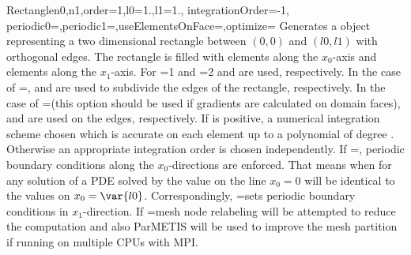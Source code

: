 \begin{funcdesc}{Rectangle}{n0,n1,order=1,l0=1.,l1=1., integrationOrder=-1, \\
  periodic0=\False,periodic1=\False,useElementsOnFace=\False,optimize=\False}
Generates a \Domain object representing a two dimensional rectangle between
$(0,0)$ and $(l0,l1)$ with orthogonal edges. The rectangle is filled with
 elements along the $x_0$-axis and
 elements along the $x_1$-axis. 
For =1 and =2
 and  
 are used, respectively. 
In the case of =\False,
 and  
 are used to subdivide the edges of the rectangle, respectively. 
In the case of =\True (this option should be used if gradients
are calculated on domain faces),
 and  
 are used on the edges, respectively.  
If  is positive, a numerical integration scheme
chosen which is accurate on each element up to a polynomial of
degree  . Otherwise
an appropriate integration order is chosen independently. If
=\True, periodic boundary conditions 
along the $x_0$-directions are enforced. That means when for any solution of a PDE solved by \finley
the value on the line $x_0=0$ will be identical to the values on $x_0=\var{l0}$.
Correspondingly,
=\False sets periodic boundary conditions
in $x_1$-direction.
If =\True mesh node relabeling will be attempted to reduce the computation and also ParMETIS will be used to improve the mesh partition if running on multiple CPUs with MPI.
\end{funcdesc}

